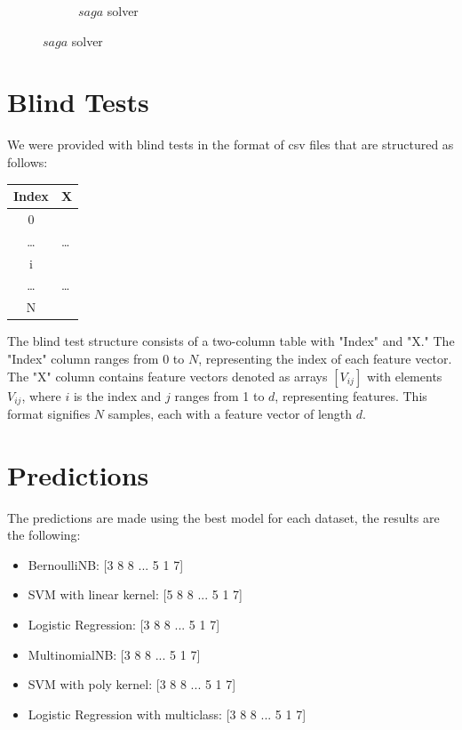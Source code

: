 \documentclass{article}
\begin{document}
\begin{titlepage}
\begin{figure}[htbp]
\begin{subfigure}[t]{0.3\linewidth}
      \caption{$saga$ solver}
      \label{fig:sample6e}
    \end{subfigure}
  \end{figure}

  \section*{Blind Tests}
  We were provided with blind tests in the format of csv files that are structured as follows:
  \newline
  \newline

  \begin{table}[htbp]
    \centering
    \begin{tabular}{|c|>{\centering\arraybackslash}m{8cm}|}
      \hline
      Index & X \\
      \hline
      0 & [$V^{(0)}_1$, $V^{(0)}_2$, ..., $V^{(0)}_j$, ... , $V^{(0)}_d$] \\
      \hline
      \dots & \dots \\
      \hline
      i & [$V^{(i)}_1$, $V^{(i)}_2$, ..., $V^{(i)}_j$, ... , $V^{(i)}_d$] \\
      \hline
      \dots & \dots \\
      \hline
      N & [$V^{(N)}_1$, $V^{(N)}_2$, ..., $V^{(N)}_j$, ... , $V^{(N)}_d$] \\
      \hline
    \end{tabular}
    \label{tab:sample}
  \end{table}

  The blind test structure consists of a two-column table with "Index" and "X." The "Index" column ranges from 0 to \(N\), representing the index of each feature vector. The "X" column contains feature vectors denoted as arrays \([V_{ij}]\) with elements \(V_{ij}\), where \(i\) is the index and \(j\) ranges from 1 to \(d\), representing features. This format signifies \(N\) samples, each with a feature vector of length \(d\).
  \newline
  \newline

  \section{Predictions}
  The predictions are made using the best model for each dataset, the results are the following:

  \begin{itemize}
    \item BernoulliNB: [3 8 8 ... 5 1 7]
    \item SVM with linear kernel: [5 8 8 ... 5 1 7]
    \item Logistic Regression: [3 8 8 ... 5 1 7]
    \item MultinomialNB: [3 8 8 ... 5 1 7]
    \item SVM with poly kernel: [3 8 8 ... 5 1 7]
    \item Logistic Regression with multiclass: [3 8 8 ... 5 1 7]
  \end{itemize}


\end{titlepage}
\end{document}
